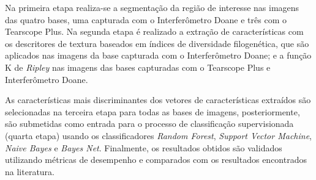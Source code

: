 Na primeira etapa realiza-se a segmentação da região de interesse nas imagens das quatro bases, uma capturada com o Interferômetro Doane e três com o Tearscope Plus. Na segunda etapa é realizado a extração de características com os descritores de textura baseados em índices de diversidade filogenética, que são aplicados nas imagens da base capturada com o Interferômetro Doane; e a função K de \textit{Ripley} nas imagens das bases capturadas com o Tearscope Plus e Interferômetro Doane.

As características mais discriminantes dos vetores de características extraídos são selecionadas na terceira etapa para todas as bases de imagens, posteriormente, são submetidas como entrada para o processo de classificação supervisionada (quarta etapa) usando os classificadores \textit{Random Forest}, \textit{Support Vector Machine}, \textit{Naive Bayes} e \textit{Bayes Net}. Finalmente, os resultados obtidos são validados utilizando métricas de desempenho e comparados com os resultados encontrados na literatura.

